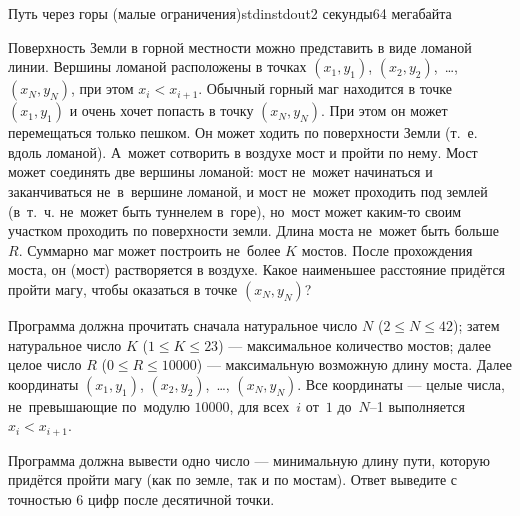 \begin{problem}{Путь через горы (малые ограничения)}{stdin}{stdout}{2 секунды}{64 мегабайта}

Поверхность Земли в горной местности можно представить в виде ломаной линии.
Вершины ломаной расположены в точках $(x_1,y_1)$, $(x_2,y_2)$,~\ldots, 
$(x_N,y_N)$, при этом $x_i<x_{i+1}$.
Обычный горный маг находится в точке $(x_1,y_1)$ и очень хочет попасть 
в точку $(x_N,y_N)$. При этом он может перемещаться только пешком. 
Он может ходить по поверхности Земли (т.~е. вдоль ломаной). А~может
сотворить в воздухе мост и пройти по нему. Мост может соединять две вершины
ломаной: мост не~может начинаться и заканчиваться не~в~вершине ломаной, 
и мост не~может проходить под землей (в~т.~ч. не~может быть туннелем в~горе),
но~мост может каким-то своим участком проходить по поверхности земли. 
Длина моста не~может быть больше~$R$. Суммарно маг может построить 
не~более $K$ мостов. После прохождения моста, он (мост) растворяется 
в воздухе. Какое наименьшее расстояние придётся пройти магу, 
чтобы оказаться в точке $(x_N,y_N)$?


\InputFile
Программа должна прочитать сначала натуральное число $N$ 
($2\leqslant N\leqslant 42$);
затем натуральное число $K$ ($1\leqslant K\leqslant 23$) ---
максимальное количество мостов;
далее целое число $R$ ($0\leqslant R\leqslant 10000$) --- максимальную 
возможную длину моста. Далее координаты $(x_1,y_1)$, $(x_2,y_2)$,~\dots, 
$(x_N,y_N)$. 
Все координаты --- целые числа, не~превышающие по~модулю $10000$, 
для всех~$i$ от~$1$ до~$N$--1 выполняется $x_i<x_{i+1}$.


\OutputFile
Программа должна вывести одно число --- минимальную длину пути, 
которую придётся пройти магу (как по земле, так и по мостам). 
Ответ выведите с точностью 6 цифр после десятичной точки.


\Examples

\begin{example}
%
\end{example}

\end{problem}
